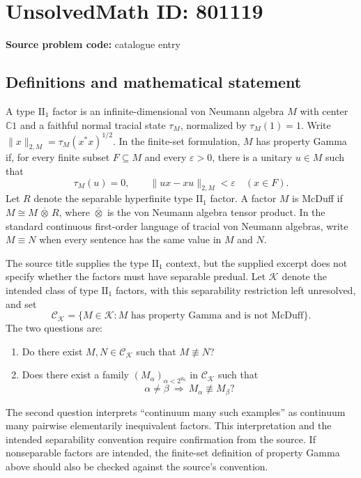 \documentclass[11pt]{article}
\newcommand{\C}{\mathbb{C}}
\begin{document}
\section*{UnsolvedMath ID: 801119}
\textbf{Source problem code:} catalogue entry
\subsection{Definitions and mathematical statement}
A type \(\mathrm{II}_1\) factor is an infinite-dimensional von Neumann algebra \(M\) with center \(\C 1\) and a faithful normal tracial state \(\tau_M\), normalized by \(\tau_M(1)=1\). Write \(\|x\|_{2,M}=\tau_M(x^*x)^{1/2}\). In the finite-set formulation, \(M\) has property Gamma if, for every finite subset \(F\subseteq M\) and every \(\varepsilon>0\), there is a unitary \(u\in M\) such that
\[
\tau_M(u)=0,\qquad \|ux-xu\|_{2,M}<\varepsilon\quad(x\in F).
\]
Let \(R\) denote the separable hyperfinite type \(\mathrm{II}_1\) factor. A factor \(M\) is McDuff if \(M\cong M\,\overline\otimes\,R\), where \(\overline\otimes\) is the von Neumann algebra tensor product. In the standard continuous first-order language of tracial von Neumann algebras, write \(M\equiv N\) when every sentence has the same value in \(M\) and \(N\).

The source title supplies the type \(\mathrm{II}_1\) context, but the supplied excerpt does not specify whether the factors must have separable predual. Let \(\mathscr K\) denote the intended class of type \(\mathrm{II}_1\) factors, with this separability restriction left unresolved, and set
\[
\mathscr C_{\mathscr K}=\{M\in\mathscr K: M\text{ has property Gamma and is not McDuff}\}.
\]
The two questions are:
\begin{enumerate}
\item Do there exist \(M,N\in\mathscr C_{\mathscr K}\) such that \(M\not\equiv N\)?
\item Does there exist a family \((M_\alpha)_{\alpha<2^{\aleph_0}}\) in \(\mathscr C_{\mathscr K}\) such that
\[
\alpha\ne\beta\ \Longrightarrow\ M_\alpha\not\equiv M_\beta?
\]
\end{enumerate}
The second question interprets ``continuum many such examples'' as continuum many pairwise elementarily inequivalent factors. This interpretation and the intended separability convention require confirmation from the source. If nonseparable factors are intended, the finite-set definition of property Gamma above should also be checked against the source's convention.
\end{document}
